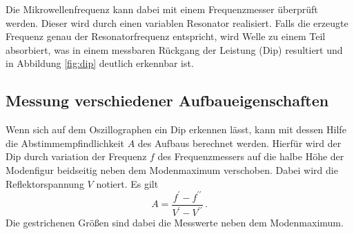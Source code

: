 Die Mikrowellenfrequenz kann dabei mit einem Frequenzmesser überprüft werden.
Dieser wird durch einen variablen Resonator realisiert. Falls die
erzeugte Frequenz genau der Resonatorfrequenz entspricht, wird Welle zu einem
Teil absorbiert, was in einem messbaren Rückgang der Leistung (Dip)
resultiert und in Abbildung \ref{fig:dip} deutlich erkennbar ist.

\subsection{Messung verschiedener Aufbaueigenschaften}
\label{subsec:messung}
Wenn sich auf dem Oszillographen ein Dip erkennen lässt, kann mit dessen Hilfe
die Abstimmempfindlichkeit $A$ des Aufbaus berechnet werden.
Hierfür wird der Dip durch variation der Frequenz $f$ des Frequenzmessers auf
die halbe Höhe der Modenfigur beidseitig neben dem Modenmaximum verschoben.
Dabei wird die Reflektorspannung $V$ notiert.
Es gilt
\begin{equation}
    \label{eqn:empfindlichkeit}
    A = \frac{f^\prime - f^{\prime\prime}}{V^\prime - V^{\prime\prime}}\,.
\end{equation}
Die gestrichenen Größen sind dabei die Messwerte neben dem Modenmaximum.

\clearpage
